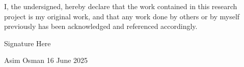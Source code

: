 I, the undersigned, hereby declare that the work contained in this research project is my original work, and that any work done by others or by myself previously has been acknowledged and referenced accordingly.

\vspace{1cm} %

\noindent %
Signature Here %

\vspace{1cm} %

\noindent %
Asim Osman 16 June 2025 %
